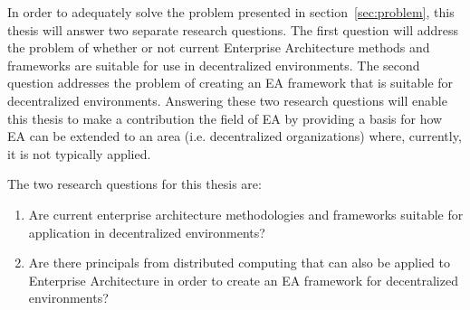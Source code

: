In order to adequately solve the problem presented in section~\ref{sec:problem}, this thesis will answer two separate research questions. The first question will address the problem of whether or not current Enterprise Architecture methods and frameworks are suitable for use in decentralized environments. The second question addresses the problem of creating an EA framework that is suitable for decentralized environments. Answering these two research questions will enable this thesis to make a contribution the field of EA by providing a basis for how EA can be extended to an area (i.e. decentralized organizations) where, currently, it is not typically applied. 

The two research questions for this thesis are:

\begin{enumerate}
\item Are current enterprise architecture methodologies and frameworks suitable for application in decentralized environments?
\label{req:1}
\item Are there principals from distributed computing that can also be applied to Enterprise Architecture in order to create an EA framework for decentralized environments?
\label{req:2}
\end{enumerate}

